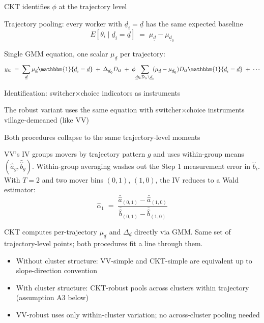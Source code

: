 \documentclass[10pt,aspectratio=169]{beamer}
\newcommand{\D}{D}
\newcommand{\thetai}{\theta_{i}}
\newcommand{\phicoef}{\phi}
\newcommand{\mud}{\mu_{\underline{d}}}
\newcommand{\Deltad}{\Delta_{\underline{d}}}
\newcommand{\DS}{\mathcal{D}_{S}}
\begin{document}
\begin{frame}{CKT identifies $\phicoef$ at the trajectory level}

  Trajectory pooling: every worker with $\underline{d}_i = \underline{d}$ has the same expected baseline
  \[
    E[\thetai \mid \underline{d}_i = \underline{d}] \;=\; \mud - \mu_{\underline{d}_0}
  \]

  \vspace{0.3em}
  Single GMM equation, one scalar $\mud$ per trajectory:
  \begin{align*}
    y_{it} \;=\; \sum_{\underline{d}} \mud \mathbbm{1}\{\underline{d}_i = \underline{d}\}
      \;+\; \Delta_{\underline{d}_0} \D_{it}
      \;+\; \phicoef \!\sum_{\underline{d}\in\DS\setminus\underline{d}_0}\!\! (\mud - \mu_{\underline{d}_0}) \D_{it} \mathbbm{1}\{\underline{d}_i = \underline{d}\}
      \;+\; \cdots
  \end{align*}

  \vspace{0.3em}
  Identification: switcher$\times$choice indicators as instruments

  \vspace{0.6em}
  The robust variant uses the same equation with switcher$\times$choice instruments village-demeaned (like VV)

\end{frame}

\begin{frame}{Both procedures collapse to the same trajectory-level moments}

  VV's IV groups movers by trajectory pattern $g$ and uses within-group means $(\bar{\hat a}_g, \bar{\hat b}_g)$.
  Within-group averaging washes out the Step 1 measurement error in $\hat b_i$.
  With $T = 2$ and two mover bins $(0,1)$, $(1,0)$, the IV reduces to a Wald estimator:
  \[
    \hat\alpha_1 \;=\; \frac{\bar{\hat a}_{(0,1)} - \bar{\hat a}_{(1,0)}}{\bar{\hat b}_{(0,1)} - \bar{\hat b}_{(1,0)}}
  \]

  \vspace{0.3em}
  CKT computes per-trajectory $\mud$ and $\Deltad$ directly via GMM.
  Same set of trajectory-level points; both procedures fit a line through them.

  \vspace{0.4em}
  \begin{itemize}
    \item Without cluster structure: VV-simple and CKT-simple are equivalent up to slope-direction convention
    \item With cluster structure: CKT-robust pools across clusters within trajectory (assumption A3 below)
    \item VV-robust uses only within-cluster variation; no across-cluster pooling needed
  \end{itemize}

\end{frame}
\end{document}
